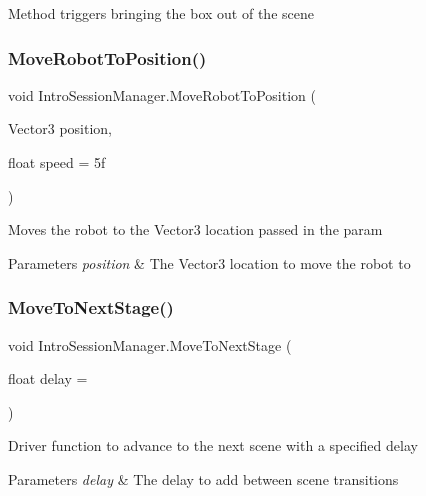 Method triggers bringing the box out of the scene 

\mbox{\label{class_intro_session_manager_a6b31e91f5f7fb8d55555424b3f795750}} 
\subsubsection{\texorpdfstring{Move\+Robot\+To\+Position()}{MoveRobotToPosition()}}
{\footnotesize\ttfamily void Intro\+Session\+Manager.\+Move\+Robot\+To\+Position (\begin{DoxyParamCaption}\item[{Vector3}]{position,  }\item[{float}]{speed = {\ttfamily 5f} }\end{DoxyParamCaption})}



Moves the robot to the Vector3 location passed in the param 


\begin{DoxyParams}{Parameters}
{\em position} & The Vector3 location to move the robot to\\
\hline
\end{DoxyParams}
\mbox{\label{class_intro_session_manager_a9541e181250bbfbfa2d16f62ccb64a22}} 
\subsubsection{\texorpdfstring{Move\+To\+Next\+Stage()}{MoveToNextStage()}}
{\footnotesize\ttfamily void Intro\+Session\+Manager.\+Move\+To\+Next\+Stage (\begin{DoxyParamCaption}\item[{float}]{delay = {} }\end{DoxyParamCaption})}



Driver function to advance to the next scene with a specified delay 


\begin{DoxyParams}{Parameters}
{\em delay} & The delay to add between scene transitions\\
\hline
\end{DoxyParams}
\mbox{\label{class_intro_session_manager_a0998c6878046777a1baecb46ff8859ec}} 
